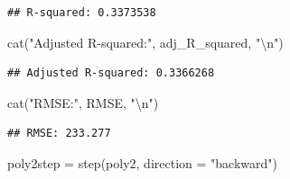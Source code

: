 \documentclass[
]{article}
\newenvironment{Shaded}{\begin{snugshade}}{\end{snugshade}}
\newcommand{\AttributeTok}[1]{\textcolor[rgb]{0.77,0.63,0.00}{#1}}
\newcommand{\FunctionTok}[1]{\textcolor[rgb]{0.00,0.00,0.00}{#1}}
\newcommand{\NormalTok}[1]{#1}
\newcommand{\OtherTok}[1]{\textcolor[rgb]{0.56,0.35,0.01}{#1}}
\newcommand{\SpecialCharTok}[1]{\textcolor[rgb]{0.00,0.00,0.00}{#1}}
\newcommand{\StringTok}[1]{\textcolor[rgb]{0.31,0.60,0.02}{#1}}
\begin{document}
\begin{verbatim}
## R-squared: 0.3373538
\end{verbatim}

\begin{Shaded}
\begin{Highlighting}[]
\FunctionTok{cat}\NormalTok{(}\StringTok{"Adjusted R{-}squared:"}\NormalTok{, adj\_R\_squared, }\StringTok{"}\SpecialCharTok{\textbackslash{}n}\StringTok{"}\NormalTok{)}
\end{Highlighting}
\end{Shaded}

\begin{verbatim}
## Adjusted R-squared: 0.3366268
\end{verbatim}

\begin{Shaded}
\begin{Highlighting}[]
\FunctionTok{cat}\NormalTok{(}\StringTok{"RMSE:"}\NormalTok{, RMSE, }\StringTok{"}\SpecialCharTok{\textbackslash{}n}\StringTok{"}\NormalTok{)}
\end{Highlighting}
\end{Shaded}

\begin{verbatim}
## RMSE: 233.277
\end{verbatim}

\begin{Shaded}
\begin{Highlighting}[]
\NormalTok{poly2step }\OtherTok{=} \FunctionTok{step}\NormalTok{(poly2, }\AttributeTok{direction =} \StringTok{"backward"}\NormalTok{)}
\end{Highlighting}
\end{Shaded}
\end{document}
